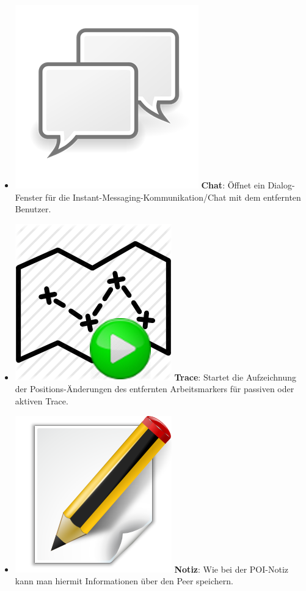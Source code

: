 \begin{itemize}[leftmargin=*,noitemsep,topsep=1ex,parsep=0pt,partopsep=0pt]
\item \includegraphics[scale=1.1]{bilder/icons/p2p-chat.png} \textbf{Chat}: Öffnet ein Dialog-Fenster für die Instant-Messaging-Kommunikation/Chat mit dem entfernten Benutzer. 
\item \includegraphics[scale=0.04]{bilder/icons/start_trace.png} \textbf{Trace}: Startet die Aufzeichnung der Positions-Änderungen des entfernten Arbeitsmarkers für passiven oder aktiven Trace.
\item \includegraphics[scale=0.07]{bilder/icons/edit-note.png} \textbf{Notiz}: Wie bei der POI-Notiz kann man hiermit Informationen über den Peer speichern.
\end{itemize}


